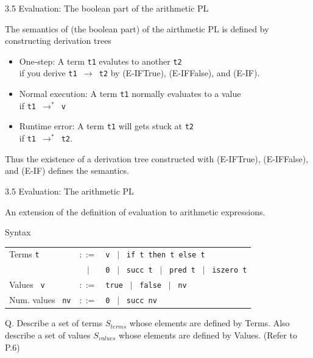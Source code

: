 \documentclass[table]{beamer}
\begin{document}
\begin{frame}[t]{3.5 Evaluation: The boolean part of the arithmetic PL} \vspace{10pt}

The semantics of (the boolean part) of the airthmetic PL is defined by constructing derivation trees

\begin{itemize}
\item One-step: A term \texttt{t1} evalutes to another \texttt{t2}\\
if you derive \texttt{t1 $\rightarrow$ t2} by (E-IFTrue), (E-IFFalse), and (E-IF).
\item Normal execution: A term \texttt{t1} normally evaluates to a value \\
if \texttt{t1 $\rightarrow^*$ v}
\item Runtime error: A term \texttt{t1} will gets stuck at \texttt{t2} \\ if \texttt{t1 $\rightarrow^*$ t2}.
\end{itemize}

\vspace{10pt}

Thus the existence of a derivation tree constructed with (E-IFTrue), (E-IFFalse), and (E-IF) defines the semantics. 

\end{frame}

\begin{frame}[t]{3.5 Evaluation: The arithmetic PL} 

An extension of the definition of evaluation to arithmetic expressions. 

\vspace{10pt}

Syntax

\vspace{5pt}

\begin{tabular}{l c l }
Terms \texttt{t} & $::=$ &
	\texttt{v} \ $|$ \ \texttt{if t then t else t} \\
	& $|$ & \texttt{0} \ $|$ \ \texttt{succ t} \ $|$ \ \texttt{pred t} \ $|$ \ \texttt{iszero t} \\
Values \  \texttt{v} & $::=$ & \texttt{true} \ $|$ \ \texttt{false} \ $|$ \ \texttt{nv}\\
Num. values \ \texttt{nv} & $::=$ & \texttt{0} \ $|$ \ \texttt{succ nv}
\end{tabular}

\vspace{1cm}

Q. Describe a set of terms $S_{terms}$ whose elements are defined by Terms.  Also describe a set of values $S_{values}$ whose elements are defined by Values.  (Refer to P.6)


\end{frame}
\end{document}
